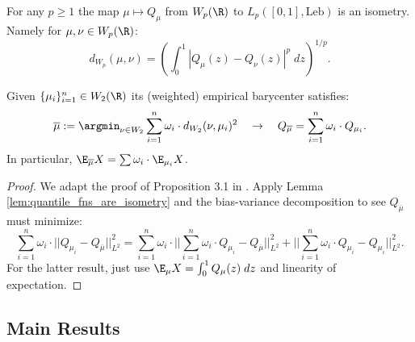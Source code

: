 \begin{lemma}
    For any $p \geq 1$ the map $\mu \mapsto Q_\mu$ from $W_p(\R)$ to $L_p([0,1], \mathrm{Leb})$ is an isometry. Namely for $\mu, \nu \in W_p(\R)$:
    \[d_{W_p}(\mu, \nu) = \left(\int_0^1 |Q_\mu(z) - Q_\nu(z)|^p \; dz \right)^{1/p}.\]
    \label{lem:quantile_fns_are_isometry}
\end{lemma}

\begin{lemma}
    Given $\{\mu_i\}_{i=1}^n \in W_2(\R)$ its (weighted) empirical barycenter satisfies:
    \[\overline{\mu} := \argmin_{\nu \in W_2} \sum_{i=1}^n \omega_i \cdot d_{W_2}(\nu, \mu_i)^2 \quad \to \quad Q_{\overline{\mu}} =  \sum_{i=1}^n \omega_i \cdot Q_{\mu_i}.\]
    \noindent In particular, $\E_{\overline{\mu}} X =  \sum \omega_i \cdot \E_{\mu_i} X$.

    \label{lem:quantile_of_w2_barycenter}
\end{lemma}

\begin{proof}
    We adapt the proof of Proposition 3.1 in \cite{raban2024_aggregate_ratings_wasserstein_barycenters}. Apply Lemma \ref{lem:quantile_fns_are_isometry} and the bias-variance decomposition to see $Q_{\overline{\mu}}$ must minimize:
    \[ \sum_{i=1}^n \omega_i \cdot ||Q_{\mu_i} - Q_{\overline{\mu}}||^2_{L^2} =  \sum_{i=1}^n \omega_i \cdot \bigg|\bigg|  \sum_{i=1}^n \omega_i \cdot Q_{\mu_i} - Q_{\overline{\mu}}\bigg |\bigg|^2_{L^2} +  \bigg|\bigg|  \sum_{i=1}^n \omega_i \cdot Q_{\mu_i} - Q_{\mu_i}\bigg |\bigg|^2_{L^2}.\]
    \noindent For the latter result, just use $\E_\mu X = \int_0^1 Q_\mu(z) \; dz$ and linearity of expectation.
\end{proof}

\subsection{Main Results}


